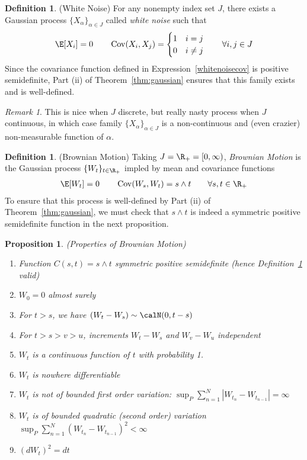 \documentclass[12pt]{article}
\theoremstyle{plain}
\newtheorem{prop}[thm]{Proposition}
\theoremstyle{definition}
\newtheorem{defn}[thm]{Definition}
\theoremstyle{remark}
\newtheorem*{rmk}{Remark}
\newcommand{\Cov}{\operatorname{Cov}}
\newcommand{\sumnN}{\sum^N_{n=1}}
\begin{document}
\begin{defn}(White Noise)
For any nonempty index set $J$, there exists a Gaussian process
$\{X_\alpha\}_{\alpha\in J}$ called \emph{white noise} such that
\begin{align}
  \E[X_i]=0
  \qquad
  \Cov(X_i,X_j)
  =
  \begin{cases}
    1 & i=j \\
    0 & i\neq j
  \end{cases}
  \qquad\forall i,j\in J
  \label{whitenoisecov}
\end{align}
Since the covariance function defined in Expression~\ref{whitenoisecov}
is positive semidefinite, Part (ii) of Theorem~\ref{thm:gaussian}
ensures that this family exists and is well-defined.
\end{defn}
\begin{rmk}
This is nice when $J$ discrete, but really nasty process when $J$
continuous, in which case family $\{X_\alpha\}_{\alpha \in J}$ is a
non-continuous and (even crazier) non-measurable function of $\alpha$.
\end{rmk}

\begin{defn}(Brownian Motion)
\label{defn:brownian}
Taking $J=\R_+=[0,\infty)$, \emph{Brownian Motion} is the Gaussian
process $\{W_t\}_{t\in\R_+}$ impled by mean and covariance
functions
\begin{align*}
  \E[W_t]=0
  \qquad
  \Cov(W_s,W_t) = s \wedge t
  \qquad \forall s,t\in\R_+
\end{align*}
To ensure that this process is well-defined by Part (ii) of
Theorem~\ref{thm:gaussian}, we must check that $s\wedge t$ is indeed a
symmetric positive semidefinite function in the next proposition.
\end{defn}

\begin{prop}\emph{(Properties of Brownian Motion)}
\begin{enumerate}[label=\emph{(\roman*)}]
  \item
    Function $C(s,t)=s\wedge t$ symmetric positive semidefinite
    (hence Definition~\ref{defn:brownian} valid)
  \item $W_0=0$ almost surely
  \item For $t>s$, we have $(W_t-W_s)\sim \calN(0,t-s)$
  \item For $t>s>v>u$, increments $W_t-W_s$ and $W_v-W_u$ independent
  \item $W_t$ is a continuous function of $t$ with probability 1.
  \item $W_t$ is nowhere differentiable
  \item $W_t$ is \emph{not} of bounded first order variation:
    $\sup_P \sumnN |W_{t_n}-W_{t_{n-1}}|=\infty$
  \item $W_t$ is of bounded \emph{quadratic} (second order) variation
    $\sup_P \sumnN (W_{t_n}-W_{t_{n-1}})^2 <\infty$
  \item $(dW_t)^2=dt$
\end{enumerate}
\end{prop}
\end{document}
